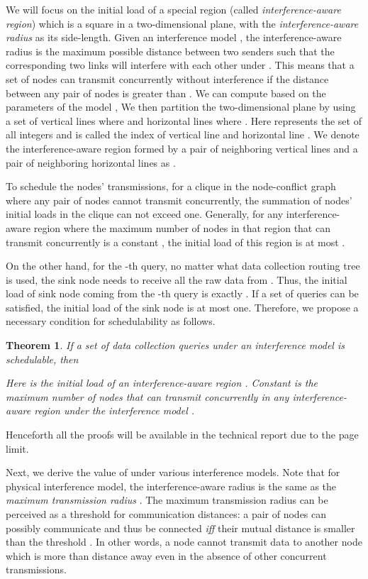 \documentclass[conference,10pt]{IEEEtran}\usepackage{amsmath}
\newtheorem{boldtheorem}{\textbf{Theorem}}
\begin{document}
We will focus on the initial load of a special
region
 (called \emph{interference-aware region})
 which is a square in a two-dimensional plane, with the \emph{interference-aware radius} as its side-length.
Given an interference model , the {interference-aware
radius}
  is the
 maximum possible distance between two senders such that the
 corresponding two links will interfere with each other under .
This means that a set of nodes can transmit concurrently without
interference  if the distance between
 any pair of nodes is greater than
.
We can compute  based
on the parameters of the
 model ,
We then partition the two-dimensional plane by using a set of
vertical lines
  where 
 and horizontal lines  where
 .
Here  represents the set of all integers
 and  is called the index of vertical line  and
 horizontal line .
We denote the {interference-aware region} formed by a pair of neighboring vertical lines
 and a pair of neighboring horizontal lines  as .

To schedule the nodes' transmissions,
 for a clique in the node-conflict graph where any pair of nodes cannot transmit concurrently,
 the summation of nodes' initial loads in the clique can not exceed one.
Generally, for any interference-aware region
  where the maximum number of nodes in that region that can
  transmit concurrently is a constant ,
 the initial load of this region is at most .

On the other hand,
for the -th query,
 no matter what data collection routing tree is used,
 the sink node needs to receive all the raw data from .
Thus, the initial load of sink node
 coming from the -th query is exactly .
If a set of queries  can be satisfied,
 the initial load of the sink node  is at most one. Therefore,
 we propose a necessary condition for schedulability as follows.
\begin{boldtheorem}\label{the:c_x}
If a set of data collection queries  under an
interference model  is schedulable, then

Here  is the initial load of
an
 interference-aware region .
Constant  is the maximum number of nodes
 that can transmit concurrently
 in any interference-aware region
 under the interference model .
\end{boldtheorem}

Henceforth all the proofs will be available in the
technical report \cite{xu-technical-globecom} due to the page limit.

Next, we derive the value of  under various
interference models.
Note that for physical interference model,
 the interference-aware radius
 is the same as the \emph{maximum transmission
radius} .
The {maximum transmission
radius } can be perceived as a threshold for communication distances:
a pair of nodes can possibly communicate and thus be
connected \emph{iff} their mutual distance is smaller than the threshold .
In other words, a node  cannot transmit data to another node 
 which is more than  distance away
 even in the absence of other concurrent transmissions.
\end{document}
